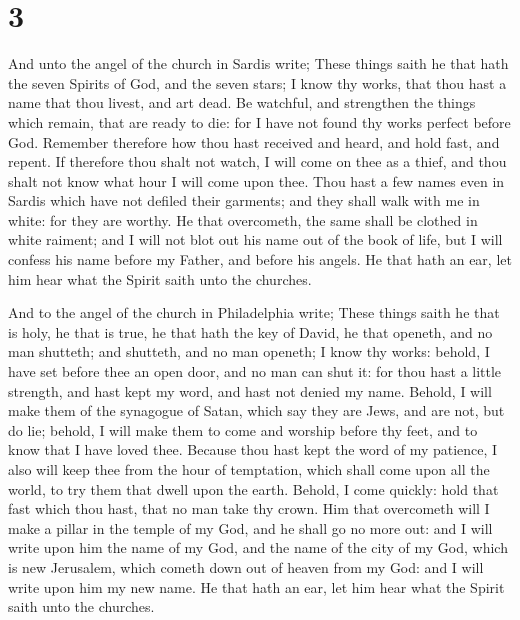 \hypertarget{section-2}{%
\section{3}\label{section-2}}

 And unto the angel of the church in Sardis write; These
things saith he that hath the seven Spirits of God, and the seven stars;
I know thy works, that thou hast a name that thou livest, and art dead.
 Be watchful, and strengthen the things which remain, that
are ready to die: for I have not found thy works perfect before God.
 Remember therefore how thou hast received and heard, and
hold fast, and repent. If therefore thou shalt not watch, I will come on
thee as a thief, and thou shalt not know what hour I will come upon
thee.  Thou hast a few names even in Sardis which have not
defiled their garments; and they shall walk with me in white: for they
are worthy.  He that overcometh, the same shall be clothed
in white raiment; and I will not blot out his name out of the book of
life, but I will confess his name before my Father, and before his
angels.  He that hath an ear, let him hear what the Spirit
saith unto the churches.

 And to the angel of the church in Philadelphia write; These
things saith he that is holy, he that is true, he that hath the key of
David, he that openeth, and no man shutteth; and shutteth, and no man
openeth;  I know thy works: behold, I have set before thee
an open door, and no man can shut it: for thou hast a little strength,
and hast kept my word, and hast not denied my name.  Behold,
I will make them of the synagogue of Satan, which say they are Jews, and
are not, but do lie; behold, I will make them to come and worship before
thy feet, and to know that I have loved thee.  Because thou
hast kept the word of my patience, I also will keep thee from the hour
of temptation, which shall come upon all the world, to try them that
dwell upon the earth.  Behold, I come quickly: hold that
fast which thou hast, that no man take thy crown.  Him that
overcometh will I make a pillar in the temple of my God, and he shall go
no more out: and I will write upon him the name of my God, and the name
of the city of my God, which is new Jerusalem, which cometh down out of
heaven from my God: and I will write upon him my new name. 
He that hath an ear, let him hear what the Spirit saith unto the
churches.

